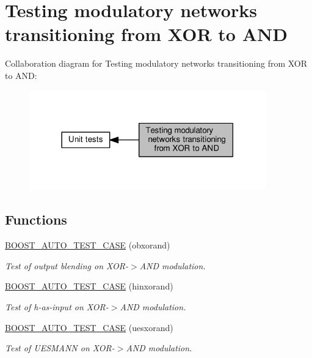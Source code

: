 \hypertarget{group__booleantests}{}\section{Testing modulatory networks transitioning from X\+OR to A\+ND}
\label{group__booleantests}
Collaboration diagram for Testing modulatory networks transitioning from X\+OR to A\+ND\+:
\nopagebreak
\begin{figure}[H]
\begin{center}
\leavevmode
\includegraphics[width=290pt]{group__booleantests}
\end{center}
\end{figure}
\subsection*{Functions}
\begin{DoxyCompactItemize}
\item 
\hyperlink{group__booleantests_ga5e75f79317d1fc1952cf79f054533a93}{B\+O\+O\+S\+T\+\_\+\+A\+U\+T\+O\+\_\+\+T\+E\+S\+T\+\_\+\+C\+A\+SE} (obxorand)
\begin{DoxyCompactList}\small\item\em Test of output blending on X\+O\+R-\/$>$A\+ND modulation. \end{DoxyCompactList}\item 
\hyperlink{group__booleantests_ga42c1f0f52fdf3856bbd02e8c31eeb0b0}{B\+O\+O\+S\+T\+\_\+\+A\+U\+T\+O\+\_\+\+T\+E\+S\+T\+\_\+\+C\+A\+SE} (hinxorand)
\begin{DoxyCompactList}\small\item\em Test of h-\/as-\/input on X\+O\+R-\/$>$A\+ND modulation. \end{DoxyCompactList}\item 
\hyperlink{group__booleantests_ga16535b47d77dc2f5f7c4e56ddfc2b081}{B\+O\+O\+S\+T\+\_\+\+A\+U\+T\+O\+\_\+\+T\+E\+S\+T\+\_\+\+C\+A\+SE} (uesxorand)
\begin{DoxyCompactList}\small\item\em Test of U\+E\+S\+M\+A\+NN on X\+O\+R-\/$>$A\+ND modulation. \end{DoxyCompactList}\end{DoxyCompactItemize}



